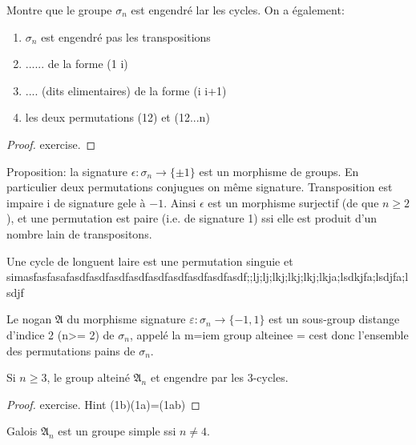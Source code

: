 \begin{proposition}
	Montre que le groupe $\sigma_n$ est engendré lar les cycles. On a également:
\end{proposition}

\begin{theorem}
	\begin{enumerate}
		\item 	$\sigma_n$ est engendré pas les transpositions
		\item ...... de la forme (1 i)
		\item .... (dits elimentaires) de la forme (i i+1)
		\item les deux permutations (12) et (12...n)
	\end{enumerate}
	
\end{theorem}
\begin{proof}
	exercise.
\end{proof}

Proposition: la signature $\epsilon : \sigma_n\rightarrow\{\pm 1\}$ est un morphisme de groups. En particulier deux permutations conjugues on même signature.
Transposition est impaire i de signature gele à $-1$.
Ainsi $\epsilon$ est un morphisme surjectif (de que $n\geq 2$), et une permutation est paire (i.e. de signature 1) ssi elle est produit d'un nombre lain de transpositons.

Une cycle de longuent laire est une permutation singuie et simasfasfasafasdfasdfasdfasdfasdfasdfasdfasdfasdf;;lj;lj;lkj;lkj;lkj;lkja;lsdkjfa;lsdjfa;lsdjf

Le nogan $\mathfrak{A}$ du morphisme signature $\varepsilon:\sigma_n\rightarrow\{-1, 1\}$ est un sous-group distange d'indice 2 (n>= 2) de $\sigma_n$, appelé la m=iem group alteinee = cest donc l'ensemble des permutations pains de $\sigma_n$.

\begin{proposition}
	Si $n\geq3$, le group alteiné $\mathfrak{A}_n$ et engendre par les 3-cycles.
\end{proposition}

\begin{proof}
	exercise. Hint (1b)(1a)=(1ab)
\end{proof}

\begin{theorem}{Galois}
	$\mathfrak{A}_n$ est un groupe simple ssi $n\neq 4$.
\end{theorem}

